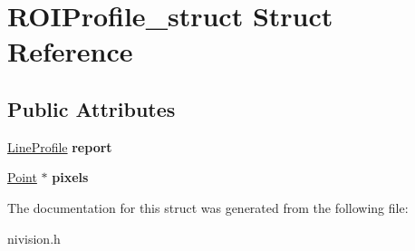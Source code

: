 \hypertarget{structROIProfile__struct}{\section{\-R\-O\-I\-Profile\-\_\-struct \-Struct \-Reference}
\label{structROIProfile__struct}
}
\subsection*{\-Public \-Attributes}
\begin{DoxyCompactItemize}
\item 
\hypertarget{structROIProfile__struct_af136d9778151da591f0853758e1eb21b}{\hyperlink{structLineProfile__struct}{\-Line\-Profile} {\bfseries report}}\label{structROIProfile__struct_af136d9778151da591f0853758e1eb21b}

\item 
\hypertarget{structROIProfile__struct_a83ea104b88d7a3548bc75d0ed67eb5d9}{\hyperlink{structPoint__struct}{\-Point} $\ast$ {\bfseries pixels}}\label{structROIProfile__struct_a83ea104b88d7a3548bc75d0ed67eb5d9}

\end{DoxyCompactItemize}


\-The documentation for this struct was generated from the following file\-:\begin{DoxyCompactItemize}
\item 
nivision.\-h\end{DoxyCompactItemize}
